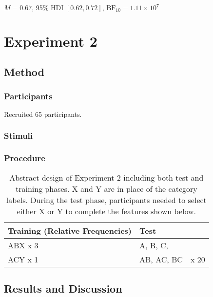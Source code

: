 \documentclass[10pt,letterpaper]{article}
\begin{document}
$M = 0.67$, 95\% HDI $[0.62, 0.72]$, $\mathrm{BF}_{10} = 1.11 \times 10^{7}$

\section{Experiment 2}

\subsection{Method}


\subsubsection*{Participants}

Recruited 65 participants.

\subsubsection*{Stimuli}

\subsubsection*{Procedure}

\begin{table}[!ht]
  \begin{center}
    \caption{Abstract design of Experiment 2 including both test and training phases. X and Y are in place of the category labels. During the test phase, participants needed to select either X or Y to complete the features shown below.\\}
    \label{tab:abstract-exp2}
    \begin{tabular}{llr} %
      \textbf{Training (Relative Frequencies)} & \textbf{Test}& \\
      \hline
      ABX x 3 &  A, B, C,         &  \\
      ACY x 1 &  AB, AC, BC      & x 20 \\
      \hline
    \end{tabular}
  \end{center}
\end{table}


\subsection{Results and Discussion}
\end{document}
